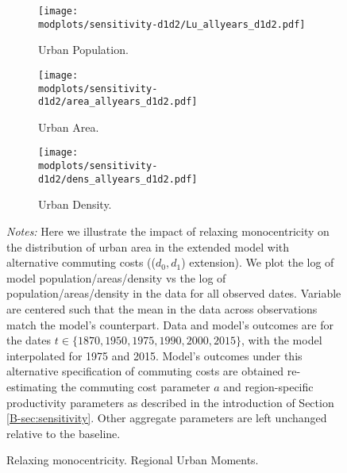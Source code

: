 \documentclass[11pt]{report}
\newcommand{\round}{revision3}  %
\newcommand{\modplots}{../../output/model/plots/\round}
\newcommand{\pthree}{0.37}  %
\begin{document}
\begin{figure}[h]
	\begin{adjustbox}{center}
				\begin{subfigure}{\pthree\textwidth}
			\texttt{[image: \\modplots/sensitivity-d1d2/Lu\_allyears\_d1d2.pdf]}
			\caption{Urban Population.\label{B-fig:model-sensi-d1d2-Lu}}
		\end{subfigure}
		\begin{subfigure}{\pthree\textwidth}
			\texttt{[image: \\modplots/sensitivity-d1d2/area\_allyears\_d1d2.pdf]}
			\caption{Urban Area.\label{B-fig:model-sensi-d1d2-area}}
		\end{subfigure}
		\begin{subfigure}{\pthree\textwidth}
			\texttt{[image: \\modplots/sensitivity-d1d2/dens\_allyears\_d1d2.pdf]}
			\caption{Urban Density.\label{B-fig:model-sensi-d1d2-density}}
		\end{subfigure}
	\end{adjustbox}
	\caption{Relaxing monocentricity. Regional Urban Moments.\label{B-fig:model-sensi-d1d2cross}}
	
	{\footnotesize \textit{Notes:} Here we illustrate the impact of relaxing monocentricity on the distribution of urban area in the extended model with alternative commuting costs (($d_0,d_1$) extension). We plot the log of model population/areas/density vs the log of population/areas/density in the data for all observed dates. Variable are centered such that the mean in the data across observations match the model's counterpart. Data and model's outcomes are for the dates $t \in \{1870, 1950, 1975, 1990, 2000, 2015 \}$, with the model interpolated for 1975 and 2015. Model's outcomes under this alternative specification of commuting costs are obtained re-estimating the commuting cost parameter $a$ and region-specific productivity parameters as described in the introduction of Section \ref{B-sec:sensitivity}. Other aggregate parameters are left unchanged relative to the baseline.}
\end{figure}
\end{document}
